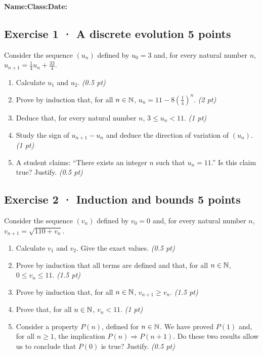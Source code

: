 \smallskip\textbf{Name:}\enspace\dotfill\quad\textbf{Class:}\enspace\dotfill\quad\textbf{Date:}\enspace\dotfill

\subsection*{Exercise 1 · A discrete evolution \hfill 5 points}Consider the sequence $(u_n)$ defined by $u_0=3$ and, for every natural number $n$, $u_{n+1}=\frac{1}{4}u_n+\frac{33}{4}$.

\begin{enumerate}

\item Calculate $u_1$ and $u_2$. \hfill\textit{(0.5 pt)}

\item Prove by induction that, for all $n\in\mathbb N$, $u_n=11-8\left(\frac{1}{4}\right)^n$. \hfill\textit{(2 pt)}

\item Deduce that, for every natural number $n$, $3\le u_n<11$. \hfill\textit{(1 pt)}

\item Study the sign of $u_{n+1}-u_n$ and deduce the direction of variation of $(u_n)$. \hfill\textit{(1 pt)}

\item A student claims: ``There exists an integer $n$ such that $u_n=11$.'' Is this claim true? Justify. \hfill\textit{(0.5 pt)}

\end{enumerate}

\subsection*{Exercise 2 · Induction and bounds \hfill 5 points}Consider the sequence $(v_n)$ defined by $v_0=0$ and, for every natural number $n$, $v_{n+1}=\sqrt{110+v_n}$.

\begin{enumerate}

\item Calculate $v_1$ and $v_2$. Give the exact values. \hfill\textit{(0.5 pt)}

\item Prove by induction that all terms are defined and that, for all $n\in\mathbb N$, $0\le v_n\le11$. \hfill\textit{(1.5 pt)}

\item Prove by induction that, for all $n\in\mathbb N$, $v_{n+1}\ge v_n$. \hfill\textit{(1.5 pt)}

\item Prove that, for all $n\in\mathbb N$, $v_n<11$. \hfill\textit{(1 pt)}

\item Consider a property $P(n)$, defined for $n\in\mathbb N$. We have proved $P(1)$ and, for all $n\ge1$, the implication $P(n)\Rightarrow P(n+1)$. Do these two results allow us to conclude that $P(0)$ is true? Justify. \hfill\textit{(0.5 pt)}

\end{enumerate}

